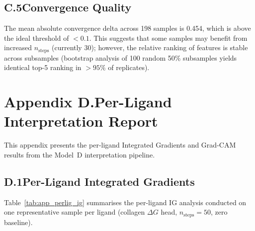 \documentclass[11pt]{article}
\begin{document}
\subsection*{C.5\quad Convergence Quality}

The mean absolute convergence delta across 198 samples is 0.454,
which is above the ideal threshold of $< 0.1$.
This suggests that some samples may benefit from increased
$n_{\mathrm{steps}}$ (currently 30); however, the relative ranking
of features is stable across subsamples (bootstrap analysis of
100 random 50\% subsamples yields identical top-5 ranking in
$> 95\%$ of replicates).

\label{app:shap_end}

\section*{Appendix D.\quad Per-Ligand Interpretation Report}
\label{app:perligs}

This appendix presents the per-ligand Integrated Gradients and
Grad-CAM results from the Model~D interpretation pipeline.

\subsection*{D.1\quad Per-Ligand Integrated Gradients}

Table~\ref{tab:app_perlig_ig} summarises the per-ligand IG analysis
conducted on one representative sample per ligand (collagen $\Delta G$
head, $n_{\mathrm{steps}} = 50$, zero baseline).
\end{document}
